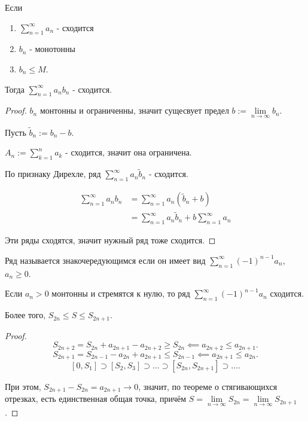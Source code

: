 \begin{theorem} \thmslashn

    Если
    \begin{enumerate}
        \item $\sum\limits_{n=1}^{\infty} a_{n}$ - сходится
        \item $b_{n}$ - монотонны
        \item $b_{n} \le M$.
    \end{enumerate}

    Тогда $\sum\limits_{n=1}^{\infty} a_{n}b_{n}$ - сходится.
    \begin{proof} \thmslashn
    
        $b_{n}$ монтонны и ограниченны, значит сущесвует предел $b := \lim\limits_{n \to \infty} b_{n}$.

        Пусть $\tilde{b}_{n} := b_{n} - b$.

        $A_{n} := \sum\limits_{k=1}^{n} a_{k}$ - сходится, значит она ограничена.

        По признаку Дирехле, ряд $\sum\limits_{n=1}^{\infty} a_{n}\tilde{b}_{n}$ - сходится.

        \begin{equation*}
            \begin{split}
                \sum\limits_{n=1}^{\infty} a_{n}b_{n} 
                &= \sum\limits_{n=1}^{\infty} a_{n}(\tilde{b}_{n} + b)\\
                &= \sum\limits_{n=1}^{\infty} a_{n}\tilde{b}_{n} + b\sum\limits_{n=1}^{\infty} a_{n}
            \end{split}
        \end{equation*}

        Эти ряды сходятся, значит нужный ряд тоже сходится.
    \end{proof}
\end{theorem}
\begin{definition} \thmslashn 

    Ряд называется знакочередующимся если он имеет вид $\sum\limits_{n=1}^{\infty} (-1)^{n-1}a_{n}$, $a_{n} \ge 0$.
\end{definition}
\begin{theorem} \thmslashn

    Если $a_{n} > 0$ монтонны и стремятся к нулю, то ряд $\sum\limits_{n=1}^{\infty} (-1)^{n-1}a_{n}$ сходится.


    Более того, $S_{2n} \le S \le S_{2n+1}$.

    \begin{proof} \thmslashn
    
       \[ S_{2n+2} = S_{2n} + a_{2n+1} - a_{2n+2} \ge S_{2n} \impliedby a_{2n+2} \le a_{2n+1} .\]
       \[ S_{2n+1} = S_{2n-1} - a_{2n} + a_{2n+1} \le S_{2n-1} \impliedby a_{2n+1} \le a_{2n} .\]
       \[ [0, S_1] \supset [S_2, S_3] \supset \ldots \supset [S_{2n}, S_{2n+1}] \supset \ldots .\]

       При этом, $S_{2n+1}-S_{2n} = a_{2n+1} \to 0$, значит, по теореме о стягивающихся отрезках, есть единственная общая точка, причём $S = \lim\limits_{n \to \infty} S_{2n} = \lim\limits_{n \to \infty} S_{2n+1}$.
    \end{proof}
\end{theorem}
